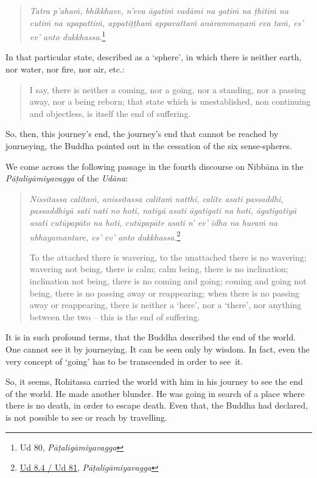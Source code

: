 \begin{quote}
\emph{Tatra p'ahaṁ, bhikkhave, n'eva āgatiṁ vadāmi na gatiṁ na ṭhitiṁ na cutiṁ na upapattiṁ, appatiṭṭhaṁ appavattaṁ anārammaṇaṁ eva taṁ, es' ev' anto dukkhassa.}\footnote{Ud 80, \emph{Pāṭaligāmiyavagga}}
\end{quote}

In that particular state, described as a `sphere', in which there is neither earth, nor water, nor fire, nor air, etc.:

\begin{quote}
I say, there is neither a coming, nor a going, nor a standing, nor a passing away, nor a being reborn; that state which is unestablished, non continuing and objectless, is itself the end of suffering.
\end{quote}

So, then, this journey's end, the journey's end that cannot be reached by journeying, the Buddha pointed out in the cessation of the six sense-spheres.

We come across the following passage in the fourth discourse on Nibbāna in the \emph{Pāṭaligāmiyavagga} of the \emph{Udāna}:

\begin{quote}
\emph{Nissitassa calitaṁ, anissitassa calitaṁ natthi, calite asati passaddhi, passaddhiyā sati nati no hoti, natiyā asati āgatigati na hoti, āgatigatiyā asati cutūpapāto na hoti, cutūpapāte asati n' ev' idha na huraṁ na ubhayamantare, es' ev' anto dukkhassa.}\footnote{\href{https://suttacentral.net/ud8.4/pli/ms}{Ud 8.4 / Ud 81}, \emph{Pāṭaligāmiyavagga}}

To the attached there is wavering, to the unattached there is no wavering; wavering not being, there is calm; calm being, there is no inclination; inclination not being, there is no coming and going; coming and going not being, there is no passing away or reappearing; when there is no passing away or reappearing, there is neither a `here', nor a `there', nor anything between the two -- this is the end of suffering.
\end{quote}

It is in such profound terms, that the Buddha described the end of the world. One cannot see it by journeying. It can be seen only by wisdom. In fact, even the very concept of `going' has to be transcended in order to see~it.

So, it seems, Rohitassa carried the world with him in his journey to see the end of the world. He made another blunder. He was going in search of a place where there is no death, in order to escape death. Even that, the Buddha had declared, is not possible to see or reach by travelling.

